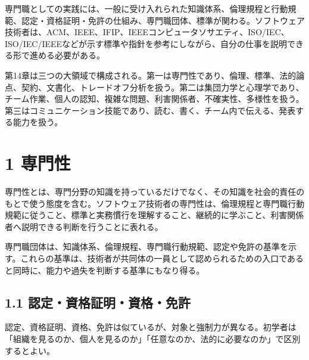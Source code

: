\documentclass[uplatex,dvipdfmx,a4paper,11pt]{jsarticle}
\begin{document}
専門職としての実践には、一般に受け入れられた知識体系、倫理規程と行動規範、認定・資格証明・免許の仕組み、専門職団体、標準が関わる。ソフトウェア技術者は、ACM、IEEE、IFIP、IEEEコンピュータソサエティ、ISO/IEC、ISO/IEC/IEEEなどが示す標準や指針を参考にしながら、自分の仕事を説明できる形で進める必要がある。

第14章は三つの大領域で構成される。第一は専門性であり、倫理、標準、法的論点、契約、文書化、トレードオフ分析を扱う。第二は集団力学と心理学であり、チーム作業、個人の認知、複雑な問題、利害関係者、不確実性、多様性を扱う。第三はコミュニケーション技能であり、読む、書く、チーム内で伝える、発表する能力を扱う。

\section*{1 専門性}


専門性とは、専門分野の知識を持っているだけでなく、その知識を社会的責任のもとで使う態度を含む。ソフトウェア技術者の専門性は、倫理規程と専門職行動規範に従うこと、標準と実務慣行を理解すること、継続的に学ぶこと、利害関係者へ説明できる判断を行うことに表れる。

専門職団体は、知識体系、倫理規程、専門職行動規範、認定や免許の基準を示す。これらの基準は、技術者が共同体の一員として認められるための入口であると同時に、能力や過失を判断する基準にもなり得る。

\subsection*{1.1 認定・資格証明・資格・免許}


認定、資格証明、資格、免許は似ているが、対象と強制力が異なる。初学者は「組織を見るのか、個人を見るのか」「任意なのか、法的に必要なのか」で区別するとよい。
\end{document}

